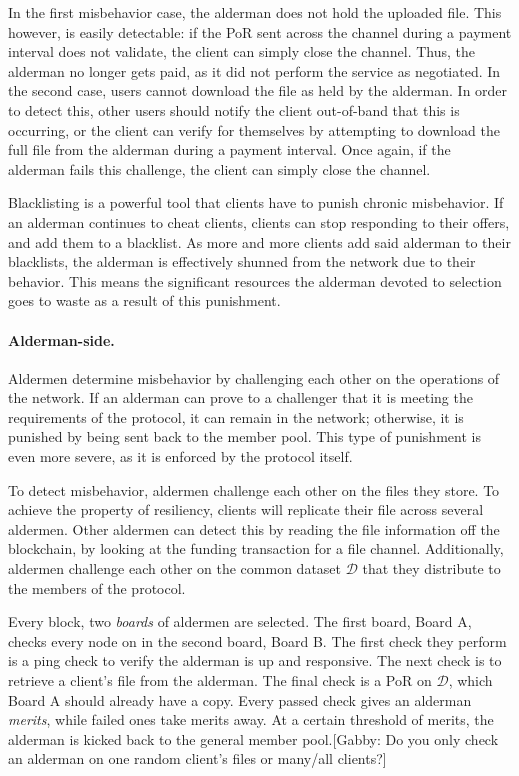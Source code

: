 \documentclass{article}
\begin{document}
In the first misbehavior case, the alderman does not hold the uploaded file.
This however, is easily detectable: if the PoR sent across the channel during a
payment interval does not validate, the client can simply close the channel.
Thus, the alderman no longer gets paid, as it did not perform the service as
negotiated. In the second case, users cannot download the file as held by the
alderman. In order to detect this, other users should notify the client
out-of-band that this is occurring, or the client can verify for themselves by
attempting to download the full file from the alderman during a payment
interval. Once again, if the alderman fails this challenge, the client can
simply close the channel.

Blacklisting is a powerful tool that clients have to punish chronic misbehavior.
If an alderman continues to cheat clients, clients can stop responding to their
offers, and add them to a blacklist. As more and more clients add said alderman
to their blacklists, the alderman is effectively shunned from the network due to
their behavior. This means the significant resources the alderman devoted to
selection goes to waste as a result of this punishment.

\paragraph{Alderman-side.} Aldermen determine misbehavior by challenging each
other on the operations of the network. If an alderman can prove to a challenger
that it is meeting the requirements of the protocol, it can remain in the
network; otherwise, it is punished by being sent back to the member pool. This
type of punishment is even more severe, as it is enforced by the protocol
itself.

To detect misbehavior, aldermen challenge each other on the files they store. To
achieve the property of resiliency, clients will replicate their file across
several aldermen. Other aldermen can detect this by reading the file information
off the blockchain, by looking at the funding transaction for a file channel.
Additionally, aldermen challenge each other on the common dataset $\mathcal{D}$
that they distribute to the members of the protocol.

Every block, two \emph{boards} of aldermen are selected. The first board, Board
A, checks every node on in the second board, Board B. The first check they
perform is a ping check to verify the alderman is up and responsive. The next
check is to retrieve a client's file from the alderman. The final check is a
PoR on $\mathcal {D}$, which Board A should already have a copy. Every passed
check gives an alderman \emph{merits}, while failed ones take merits away. At a
certain threshold of merits, the alderman is kicked back to the general member
pool.[Gabby: Do you only check an alderman on one random client's files or many/all clients?]
\end{document}
